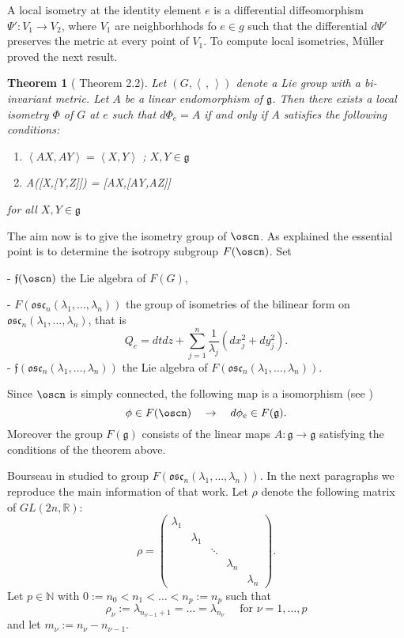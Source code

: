 \documentclass[11pt]{amsart}
\newcommand{\lela}{\left \langle}
\newcommand{\rira}{\right \rangle}
\newcommand{\mgg}{\mathfrak g }
\theoremstyle{plain}
\newtheorem{thm}{Theorem}[section]
\theoremstyle{definition}
\theoremstyle{remark}
\begin{document}
    
    A local isometry  at the identity element  $e$ is a differential diffeomorphism $\Psi':V_1 \to V_2$, where $V_1$ are neighborhhods fo $e\in g$ such that the differential $d\Psi'$ preserves the metric at every point of $V_1$.  To compute local isometries, M\"uller proved the next result.

    \begin{thm}[\cite{MU} Theorem 2.2] 
    Let $(G, \lela\,,\,\rira)$ denote a Lie group with a bi-invariant metric.     Let $A$ be a linear endomorphism of $\mgg$. Then there exists a local isometry $\Phi$ of $G$ at $e$ such that $d \Phi_e = A$ if and only if $A$ satisfies the following conditions:
        \begin{enumerate}
            \item $\lela AX, AY \rira = \lela X, Y \rira$ ; $X,Y \in \mgg$
            \item A([X,[Y,Z]]) = [AX,[AY,AZ]]
        \end{enumerate}
        for all $X,Y \in \mgg$
    \end{thm}

The aim now is to give the isometry group of $\oscn$. As explained the essential point is to determine the isotropy subgroup $F(\oscn)$. Set 

- $\mathfrak f(\oscn)$ the Lie algebra of $F(G)$,

- $F(\mathfrak{osc}_n(\lambda_1, \hdots, \lambda_n))$ the group of isometries of the bilinear form on $\mathfrak{osc}_n(\lambda_1, \hdots, \lambda_n)$, that is 
$$Q_e = dtdz + \sum_{j=1}^n \frac{1}{\lambda_j}(dx_j^2 + dy_j^2).$$
- $\mathfrak f(\mathfrak{osc}_n(\lambda_1, \hdots, \lambda_n))$ the Lie algebra of $F(\mathfrak{osc}_n(\lambda_1, \hdots, \lambda_n))$. 

Since $\oscn$ is simply connected, the following map is a isomorphism (see \cite{MU})
$$\phi \in F(\oscn) \quad \to \quad d\phi_e\in F(\mathfrak g).$$
Moreover the group $F(\mathfrak g)$ consists of the linear maps $A:\mathfrak g\to \mathfrak g$ satisfying the conditions of the theorem above. 

Bourseau in\cite{Bou} studied to group $F(\mathfrak{osc}_n(\lambda_1, \hdots, \lambda_n))$. In the next paragraphs we reproduce the main  information of that work. Let $\rho$ denote the following matrix of $GL(2n, \mathbb R)$:
$$ \rho = \left( 
\begin{matrix} 
\lambda_1 & & & & \\
& \lambda_1 &   & &\\
& & \ddots & & \\
& & & \lambda_n & \\
& & & & \lambda_n
\end{matrix}\right).$$
Let $p\in \mathbb N$ with $0:=n_0 < n_1 < \hdots < n_p:=n_p$ such that
$$\rho_{\nu}:=\lambda_{n_{\nu - 1}+ 1}= \hdots = \lambda_{n_{\nu}}\quad \mbox{ for } \nu=1, \hdots, p$$ and let $m_{\nu}:=n_{\nu}- n_{{\nu}-1}$. 
    
\end{document}
